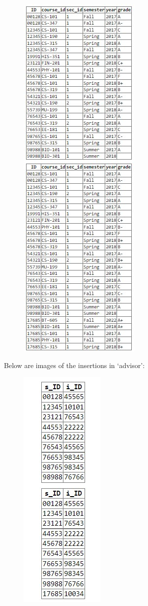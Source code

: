 \documentclass{article}
\begin{document}
\begin{figure}[!hbt]
    \centering
    \includegraphics[scale=1.8]{pics/insert-pic8.jpg}
    \label{fig:ins8}
\end{figure}
\newpage \noindent
Below are images of the insertions in `advisor':
\begin{figure}[!hbt]
    \centering
    \includegraphics[scale=1.5]{pics/insert-pic9.jpg}
    \label{fig:ins9}
\end{figure} \\
\end{document}
